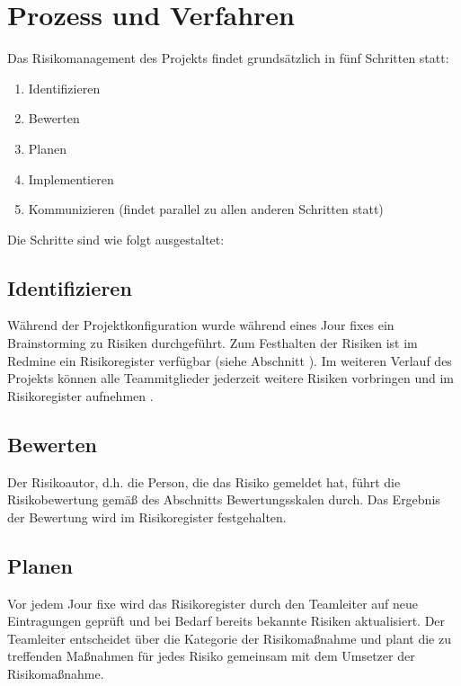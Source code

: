 \documentclass[a4paper,11pt,listof=numbered,glossary=totoc,parskip=half,toc=bib]{scrreprt}
\begin{document}
\section{Prozess und Verfahren}

Das Risikomanagement des Projekts findet grundsätzlich in fünf Schritten statt:

\begin{enumerate}
	\item Identifizieren
	\item Bewerten
	\item Planen
	\item Implementieren
	\item Kommunizieren (findet parallel zu allen anderen Schritten statt)
\end{enumerate}

Die Schritte sind wie folgt ausgestaltet:

\subsection{Identifizieren}

Während der Projektkonfiguration wurde während eines Jour fixes ein Brainstorming zu Risiken durchgeführt. Zum Festhalten der Risiken ist im Redmine ein Risikoregister verfügbar (siehe Abschnitt ). Im weiteren Verlauf des Projekts können alle Teammitglieder jederzeit weitere Risiken vorbringen und im Risikoregister aufnehmen .

\subsection{Bewerten}

Der Risikoautor, d.h. die Person, die das Risiko gemeldet hat, führt die Risikobewertung gemäß des Abschnitts Bewertungsskalen durch. Das Ergebnis der Bewertung wird im Risikoregister festgehalten.

\subsection{Planen}

Vor jedem Jour fixe wird das Risikoregister durch den Teamleiter auf neue Eintragungen geprüft und bei Bedarf bereits bekannte Risiken aktualisiert. Der Teamleiter entscheidet über die Kategorie der Risikomaßnahme und plant die zu treffenden Maßnahmen für jedes Risiko gemeinsam mit dem Umsetzer der Risikomaßnahme.
\end{document}
